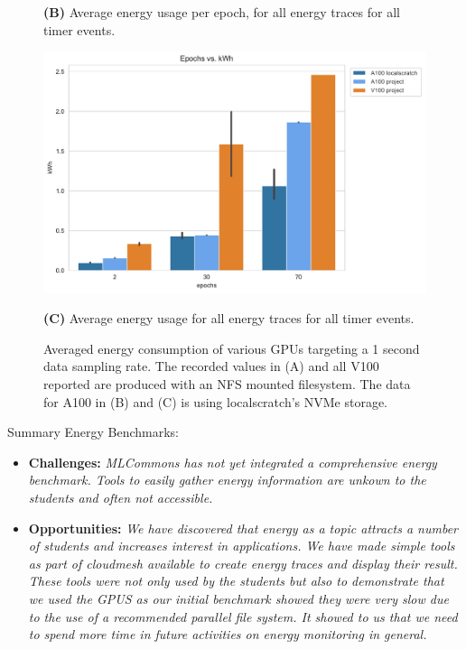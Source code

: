 \documentclass[utf8]{FrontiersinVancouver} %
\begin{document}
\begin{figure}[htb]
\begin{center}
         {\bf (B)} Average energy usage per epoch, for all energy traces for all timer events.

        \includegraphics[height=0.28\textheight]{images/total_epoch_vs_watts_new}

        {\bf (C)} Average energy usage for all energy traces for all timer events.


  \end{center}

  \caption{Averaged energy consumption of various GPUs targeting a 1 second data sampling rate. The recorded values in (A) and all V100 reported are produced with an NFS mounted filesystem.  The data for A100 in (B) and (C) is using localscratch's NVMe storage.} 
  \label{fig:energy-graphs-compare}
\end{figure}


\begin{tcolorbox}
Summary Energy Benchmarks:

\begin{itemize}
\item {\bf Challenges:} {\it MLCommons has not yet integrated a comprehensive energy benchmark. Tools to easily gather energy information are unkown to the students and often not accessible.}
\item {\bf Opportunities:} {\it We have discovered that energy as a topic attracts a number of students and increases interest in applications. We have made simple tools as part of cloudmesh available to create energy traces and display their result. These tools were not only used by the students but also to demonstrate that we used the GPUS as our initial benchmark showed they were very slow due to the use of a recommended parallel file system. It showed to us that we need to spend more time in future activities on energy monitoring in general.}
\end{itemize}
\end{tcolorbox}
\end{document}
